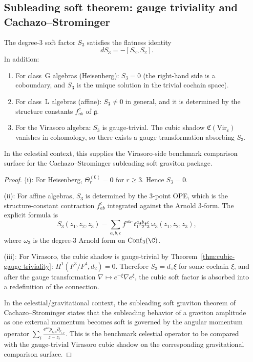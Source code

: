 \subsection{Subleading soft theorem: gauge triviality and Cachazo--Strominger}

\begin{theorem}
The degree-$3$ soft factor $S_3$ satisfies the flatness identity
\begin{equation}
dS_3 = -[S_2, S_2].
\end{equation}
In addition:
\begin{enumerate}[label=\textup{(\roman*)}]
\item For class~G algebras (Heisenberg): $S_3 = 0$ (the right-hand side is a coboundary,
 and $S_3$ is the unique solution in the trivial cochain space).
\item For class~L algebras (affine): $S_3 \neq 0$ in general, and it is determined by
 the structure constants $f^c_{ab}$ of $\mathfrak{g}$.
\item For the Virasoro algebra: $S_3$ is gauge-trivial. The cubic shadow
 $\mathfrak{C}(\mathrm{Vir}_c)$ vanishes in cohomology, so there exists a gauge
 transformation absorbing $S_3$.
\end{enumerate}
In the celestial context, this supplies the Virasoro-side benchmark
comparison surface for the Cachazo--Strominger subleading soft
graviton package.
\end{theorem}

\begin{proof}
(i): For Heisenberg, $\Theta^{(0)}_r = 0$ for $r \geq 3$. Hence $S_3 = 0$.

(ii): For affine algebras, $S_3$ is determined by the $3$-point OPE, which is
the structure-constant contraction $f^c_{ab}$ integrated against the Arnold $3$-form.
The explicit formula is
\[
S_3(z_1, z_2, z_3) = \sum_{a,b,c} f^{abc} \, t^a_1 t^b_2 t^c_3 \,
\omega_3(z_1, z_2, z_3),
\]
where $\omega_3$ is the degree-$3$ Arnold form on $\mathrm{Conf}_3(\C)$.

(iii): For Virasoro, the cubic shadow is gauge-trivial by
Theorem~\ref*{thm:cubic-gauge-triviality}: $H^1(F^3/F^4, d_2) = 0$.
Therefore $S_3 = d_\pi \xi$ for some cochain $\xi$, and after the gauge
transformation $\nabla \mapsto e^{-\xi} \nabla e^{\xi}$, the cubic soft factor
is absorbed into a redefinition of the connection.

In the celestial/gravitational context, the subleading soft graviton theorem of
Cachazo--Strominger states that the subleading behavior of a graviton amplitude
as one external momentum becomes soft is governed by the angular momentum operator
$\sum_i \frac{\epsilon^{\mu\nu} p_{i,\mu} \partial_{p_{i,\nu}}}{z - z_i}$.
This is the benchmark celestial operator to be compared with the
gauge-trivial Virasoro cubic shadow on the corresponding
gravitational comparison surface.
\end{proof}

